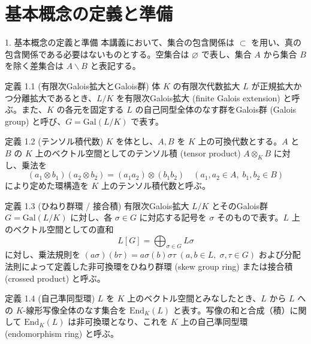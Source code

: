 \documentclass[11pt]{beamer}
\begin{document}
\section{基本概念の定義と準備}
\begin{frame}[allowframebreaks]{1. 基本概念の定義と準備}
    本講義において、集合の包含関係は $\subset$ を用い、真の包含関係である必要はないものとする。空集合は $\varnothing$ で表し、集合 $A$ から集合 $B$ を除く差集合は $A \smallsetminus B$ と表記する。

    \begin{block}{定義 1.1 (有限次Galois拡大とGalois群)}
        体 $K$ の有限次代数拡大 $L$ が正規拡大かつ分離拡大であるとき、$L/K$ を有限次Galois拡大 (finite Galois extension) と呼ぶ。また、$K$ の各元を固定する $L$ の自己同型全体のなす群をGalois群 (Galois group) と呼び、$G = \mathrm{Gal}(L/K)$ で表す。
    \end{block}

    \begin{block}{定義 1.2 (テンソル積代数)}
        $K$ を体とし、$A, B$ を $K$ 上の可換代数とする。$A$ と $B$ の $K$ 上のベクトル空間としてのテンソル積 (tensor product) $A \otimes_K B$ に対し、乗法を
        \[ (a_1 \otimes b_1)(a_2 \otimes b_2) = (a_1 a_2) \otimes (b_1 b_2) \quad (a_1, a_2 \in A, \; b_1, b_2 \in B) \]
        により定めた環構造を $K$ 上のテンソル積代数と呼ぶ。
    \end{block}

    \begin{block}{定義 1.3 (ひねり群環 / 接合積)}
        有限次Galois拡大 $L/K$ とそのGalois群 $G = \mathrm{Gal}(L/K)$ に対し、各 $\sigma \in G$ に対応する記号を $\sigma$ そのもので表す。$L$ 上のベクトル空間としての直和
        \[ L[G] = \bigoplus_{\sigma \in G} L\sigma \]
        に対し、乗法規則を $(a\sigma)(b\tau) = a\sigma(b)\sigma\tau \; (a, b \in L, \; \sigma, \tau \in G)$ および分配法則によって定義した非可換環をひねり群環 (skew group ring) または接合積 (crossed product) と呼ぶ。
    \end{block}

    \begin{block}{定義 1.4 (自己準同型環)}
        $L$ を $K$ 上のベクトル空間とみなしたとき、$L$ から $L$ への $K$-線形写像全体のなす集合を $\mathrm{End}_K(L)$ と表す。写像の和と合成（積）に関して $\mathrm{End}_K(L)$ は非可換環となり、これを $K$ 上の自己準同型環 (endomorphism ring) と呼ぶ。
    \end{block}
\end{frame}
\end{document}
